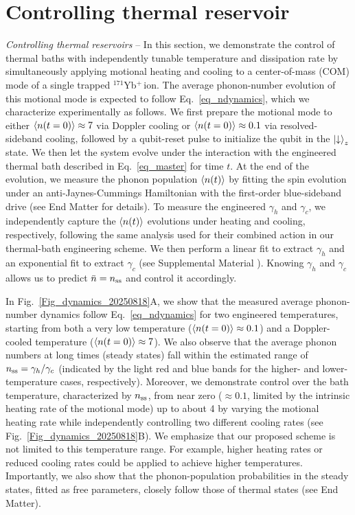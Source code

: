 \documentclass[%
reprint,
superscriptaddress,
amsmath,amssymb,
aps,
prl,
floatfix,
]{revtex4-2}
\newcommand{\Yb}{$^{171}$Yb$^+\,$}
\begin{document}
\section{Controlling thermal reservoir}
\fi
\emph{Controlling thermal reservoirs} -- In this section, we demonstrate the control of thermal baths with independently tunable temperature and dissipation rate by simultaneously applying motional heating and cooling to a center-of-mass (COM) mode of a single trapped \Yb ion. The average phonon-number evolution of this motional mode is expected to follow Eq.~\eqref{eq_ndynamics}, which we characterize experimentally as follows. We first prepare the motional mode to either $\braket{n(t=0)}\approx7$ via Doppler cooling or $\braket{n(t=0)}\approx0.1$ via resolved-sideband cooling, followed by a qubit-reset pulse to initialize the qubit in the $\ket{\downarrow}_z$ state. We then let the system evolve under the interaction with the engineered thermal bath described in Eq.~\eqref{eq_master} for time $t$. At the end of the evolution, we measure the phonon population $\braket{n(t)}$ by fitting the spin evolution under an anti-Jaynes-Cummings Hamiltonian with the first-order blue-sideband drive (see End Matter for details).
To measure the engineered $\gamma_h$ and $\gamma_c$, we independently capture the $\braket{n(t)}$ evolutions under heating and cooling, respectively, following the same analysis used for their combined action in our thermal-bath engineering scheme. We then perform a linear fit to extract $\gamma_h$ and an exponential fit to extract $\gamma_c$ (see Supplemental Material \cite{so2025fT_supp}). Knowing $\gamma_h$ and $\gamma_c$ allows us to predict $\bar{n}=n_{\rm ss}$ and control it accordingly.

In Fig.~\ref{Fig_dynamics_20250818}A, we show that the measured average phonon-number dynamics follow Eq.~\eqref{eq_ndynamics} for two engineered temperatures, starting from both a very low temperature ($\braket{n(t=0)}\approx 0.1$) and a Doppler-cooled temperature ($\braket{n(t=0)}\approx 7$). We also observe that the average phonon numbers at long times (steady states) fall within the estimated range of $n_{\rm ss} = \gamma_h/\gamma_c$ (indicated by the light red and blue bands for the higher- and lower-temperature cases, respectively). Moreover, we demonstrate control over the bath temperature, characterized by $n_{\rm ss}$, from near zero ($\approx 0.1$, limited by the intrinsic heating rate of the motional mode) up to about 4 by varying the motional heating rate while independently controlling two different cooling rates (see Fig.~\ref{Fig_dynamics_20250818}B). We emphasize that our proposed scheme is not limited to this temperature range. For example, higher heating rates or reduced cooling rates could be applied to achieve higher temperatures. Importantly, we also show that the phonon-population probabilities in the steady states, fitted as free parameters, closely follow those of thermal states (see End Matter).
\end{document}
